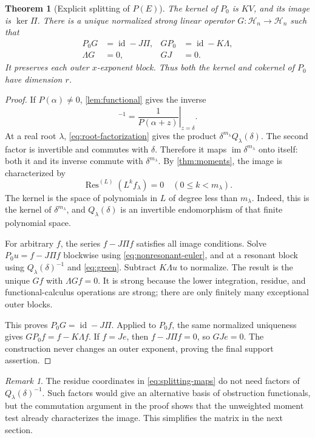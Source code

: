 \documentclass[11pt,a4paper]{article}
\numberwithin{equation}{section}
\newtheorem{theorem}{Theorem}[section]
\theoremstyle{definition}
\theoremstyle{remark}
\newtheorem{remark}[remark]{Remark}
\newcommand{\HH}{\mathcal H}
\newcommand{\Res}{\operatorname{Res}}
\newcommand{\im}{\operatorname{im}}
\newcommand{\id}{\operatorname{id}}
\begin{document}
\begin{theorem}[Explicit splitting of $P(E)$]
\label{thm:euler-split}
The kernel of $P_0$ is $KV$, and its image is $\ker\Pi$. There is a unique normalized strong linear operator $G:\HH_n\to\HH_n$ such that
\begin{align}
 P_0G&=\id-J\Pi,&GP_0&=\id-K\Lambda,\\
 \Lambda G&=0,&GJ&=0.
 \label{eq:split-identities}
\end{align}
It preserves each outer $x$-exponent block. Thus both the kernel and cokernel of $P_0$ have dimension $r$.
\end{theorem}
\begin{proof}
If $P(\alpha)\ne0$, \cref{lem:functional} gives the inverse
\begin{equation}
 [P(\alpha+\delta)]^{-1}
 =\left.\frac1{P(\alpha+z)}\right|_{z=\delta}.
 \label{eq:nonresonant-euler}
\end{equation}
At a real root $\lambda$, \eqref{eq:root-factorization} gives the product $\delta^{m_\lambda}Q_\lambda(\delta)$. The second factor is invertible and commutes with $\delta$. Therefore it maps $\im\delta^{m_\lambda}$ onto itself: both it and its inverse commute with $\delta^{m_\lambda}$. By \cref{thm:moments}, the image is characterized by
\[
 \Res^{(L)}(L^k f_\lambda)=0\quad(0\le k<m_\lambda).
\]
The kernel is the space of polynomials in $L$ of degree less than $m_\lambda$. Indeed, this is the kernel of $\delta^{m_\lambda}$, and $Q_\lambda(\delta)$ is an invertible endomorphism of that finite polynomial space.

For arbitrary $f$, the series $f-J\Pi f$ satisfies all image conditions. Solve $P_0u=f-J\Pi f$ blockwise using \eqref{eq:nonresonant-euler}, and at a resonant block using $Q_\lambda(\delta)^{-1}$ and \eqref{eq:green}. Subtract $K\Lambda u$ to normalize. The result is the unique $Gf$ with $\Lambda Gf=0$. It is strong because the lower integration, residue, and functional-calculus operations are strong; there are only finitely many exceptional outer blocks.

This proves $P_0G=\id-J\Pi$. Applied to $P_0f$, the same normalized uniqueness gives $GP_0f=f-K\Lambda f$. If $f=Je$, then $f-J\Pi f=0$, so $GJe=0$. The construction never changes an outer exponent, proving the final support assertion.
\end{proof}

\begin{remark}
The residue coordinates in \eqref{eq:splitting-maps} do not need factors of $Q_\lambda(\delta)^{-1}$. Such factors would give an alternative basis of obstruction functionals, but the commutation argument in the proof shows that the unweighted moment test already characterizes the image. This simplifies the matrix in the next section.
\end{remark}
\end{document}

